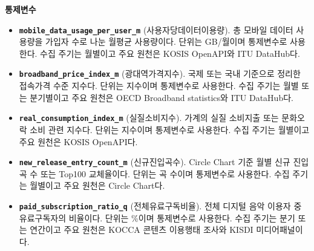 \documentclass[11pt,a4paper]{report}
\newenvironment{summarylist}{\begin{itemize}[leftmargin=1.8em,itemsep=0.35em,topsep=0.35em]\RaggedRight}{\end{itemize}}
\begin{document}
\noindent\textbf{통제변수}
\begin{summarylist}
  \item \textbf{\nolinkurl{mobile_data_usage_per_user_m}} (사용자당데이터이용량). 총 모바일 데이터 사용량을 가입자 수로 나눈 월평균 사용량이다. 단위는 GB/월이며 통제변수로 사용한다. 수집 주기는 월별이고 주요 원천은 KOSIS OpenAPI와 ITU DataHub다.
  \item \textbf{\texttt{broadband\_price\_index\_m}} (광대역가격지수). 국제 또는 국내 기준으로 정리한 접속가격 수준 지수다. 단위는 지수이며 통제변수로 사용한다. 수집 주기는 월별 또는 분기별이고 주요 원천은 OECD Broadband statistics와 ITU DataHub다.
  \item \textbf{\texttt{real\_consumption\_index\_m}} (실질소비지수). 가계의 실질 소비지출 또는 문화오락 소비 관련 지수다. 단위는 지수이며 통제변수로 사용한다. 수집 주기는 월별이고 주요 원천은 KOSIS OpenAPI다.
  \item \textbf{\nolinkurl{new_release_entry_count_m}} (신규진입곡수). Circle Chart 기준 월별 신규 진입곡 수 또는 Top100 교체율이다. 단위는 곡 수이며 통제변수로 사용한다. 수집 주기는 월별이고 주요 원천은 Circle Chart다.
  \item \textbf{\texttt{paid\_subscription\_ratio\_q}} (전체유료구독비율). 전체 디지털 음악 이용자 중 유료구독자의 비율이다. 단위는 \%이며 통제변수로 사용한다. 수집 주기는 분기 또는 연간이고 주요 원천은 KOCCA 콘텐츠 이용행태 조사와 KISDI 미디어패널이다.
\end{summarylist}
\endgroup
\end{document}
